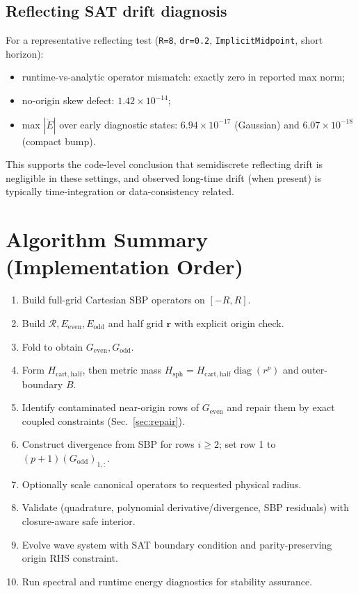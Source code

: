 \documentclass[
  aps,
  pre,
  reprint,
  superscriptaddress,
  nofootinbib
]{revtex4-2}
\newcommand{\diag}{\operatorname{diag}}
\newcommand{\Rmat}{\mathcal{R}}
\newcommand{\Ee}{E_{\mathrm{even}}}
\newcommand{\Eo}{E_{\mathrm{odd}}}
\newcommand{\Ge}{G_{\mathrm{even}}}
\newcommand{\Go}{G_{\mathrm{odd}}}
\newcommand{\Hs}{H_{\mathrm{sph}}}
\newcommand{\Hc}{H_{\mathrm{cart,half}}}
\begin{document}
\subsection{Reflecting SAT drift diagnosis}
For a representative reflecting test (\texttt{R=8}, \texttt{dr=0.2},
\texttt{ImplicitMidpoint}, short horizon):
\begin{itemize}
  \item runtime-vs-analytic operator mismatch: exactly zero in reported max norm;
  \item no-origin skew defect: $1.42\times10^{-14}$;
  \item max $|\dot E|$ over early diagnostic states:
  $6.94\times10^{-17}$ (Gaussian) and $6.07\times10^{-18}$ (compact bump).
\end{itemize}
This supports the code-level conclusion that semidiscrete reflecting drift is
negligible in these settings, and observed long-time drift (when present) is typically
time-integration or data-consistency related.

\section{Algorithm Summary (Implementation Order)}
\begin{enumerate}
  \item Build full-grid Cartesian SBP operators on $[-R,R]$.
  \item Build $\Rmat,\Ee,\Eo$ and half grid $\bm{r}$ with explicit origin check.
  \item Fold to obtain $\Ge,\Go$.
  \item Form $\Hc$, then metric mass $\Hs=\Hc\diag(r^p)$ and outer-boundary $B$.
  \item Identify contaminated near-origin rows of $\Ge$ and repair them by exact
  coupled constraints (Sec.~\ref{sec:repair}).
  \item Construct divergence from SBP for rows $i\ge2$; set row 1 to
  $(p+1)(\Go)_{1,:}$.
  \item Optionally scale canonical operators to requested physical radius.
  \item Validate (quadrature, polynomial derivative/divergence, SBP residuals) with
  closure-aware safe interior.
  \item Evolve wave system with SAT boundary condition and parity-preserving origin RHS
  constraint.
  \item Run spectral and runtime energy diagnostics for stability assurance.
\end{enumerate}
\end{document}
